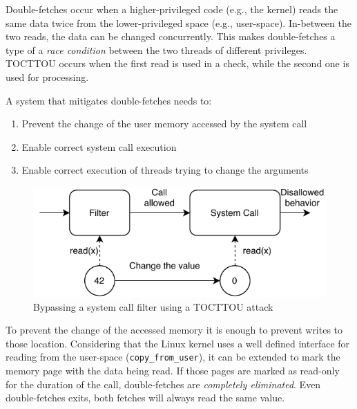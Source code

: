 
Double-fetches\cite{serna08doublefetch, twizsgrakky07ring0, wilhelm2016xenpwn,
wang2018survey} occur when a higher-privileged code (e.g., the kernel) reads the
same data twice from the lower-privileged space (e.g., user-space). In-between
the two reads, the data can be changed concurrently. This makes double-fetches a
type of a \emph{race condition} between the two threads of different privileges.
TOCTTOU occurs when the first read is used in a check, while the second one is
used for processing.


A system that mitigates double-fetches needs to:
\begin{enumerate}
  \item Prevent the change of the user memory accessed by the system call
  \item Enable correct system call execution
  \item Enable correct execution of threads trying to change the arguments
\end{enumerate}


\begin{figure}[]
  \centering
  \includegraphics[width=.85\linewidth]{img/tocttou.pdf}
  \caption{Bypassing a system call filter using a TOCTTOU attack}
  \label{fig:tocttou}
\end{figure}


To prevent the change of the accessed memory it is enough to prevent writes to
those location. Considering that the Linux kernel uses a well defined interface
for reading from the user-space (\texttt{copy\_from\_user}), it can be extended
to mark the memory page with the data being read. If those pages are marked as
read-only for the duration of the call, double-fetches are \emph{completely
eliminated}. Even double-fetches exits, both fetches will always read the same
value.

